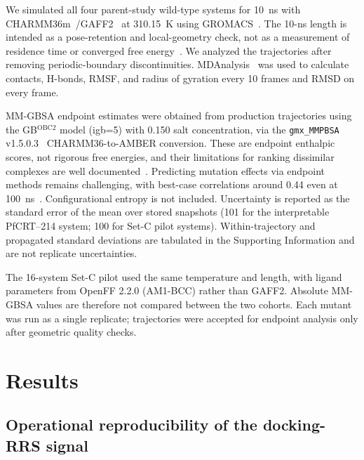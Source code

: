 \documentclass[journal=jcisd8,manuscript=article,layout=traditional]{achemso}
\begin{document}
We simulated all four parent-study wild-type systems for \qty{10}{\nano\second} with CHARMM36m~\citep{charmm36m_2017}/GAFF2~\citep{wang2004gaff} at \qty{310.15}{\kelvin} using GROMACS~\citep{gromacs_2015,lindahl_2024}. The 10-ns length is intended as a pose-retention and local-geometry check, not as a measurement of residence time or converged free energy~\citep{wei2024structure}. We analyzed the trajectories after removing periodic-boundary discontinuities. MDAnalysis~\citep{mdanalysis_2011} was used to calculate contacts, H-bonds, RMSF, and radius of gyration every \num{10} frames and RMSD on every frame.

MM-GBSA endpoint estimates were obtained from production trajectories using the GB$^{\text{OBC2}}$ model (igb=5) with \qty{0.150}{\molar} salt concentration, via the \texttt{gmx\_MMPBSA} v1.5.0.3~\citep{gmx_mmpbsa_2021} CHARMM36-to-AMBER conversion. These are endpoint enthalpic scores, not rigorous free energies, and their limitations for ranking dissimilar complexes are well documented~\citep{roux2024mmgbsa,genheden2015mmpbsa}. Predicting mutation effects via endpoint methods remains challenging, with best-case correlations around 0.44 even at 100~ns~\citep{yu2022mutation_mmgbsa}. Configurational entropy is not included. Uncertainty is reported as the standard error of the mean over stored snapshots (\num{101} for the interpretable PfCRT--214 system; \num{100} for Set-C pilot systems). Within-trajectory and propagated standard deviations are tabulated in the Supporting Information and are not replicate uncertainties.

The 16-system Set-C pilot used the same temperature and length, with ligand parameters from OpenFF 2.2.0 (AM1-BCC) rather than GAFF2. Absolute MM-GBSA values are therefore not compared between the two cohorts. Each mutant was run as a single replicate; trajectories were accepted for endpoint analysis only after geometric quality checks.


\section{Results}

\subsection{Operational reproducibility of the docking-RRS signal}
\end{document}
